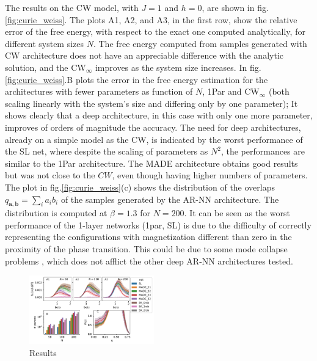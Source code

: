 \documentclass[aps,physrev,10pt,floatfix,reprint]{revtex4-2}
\begin{document}
The results on the CW model, with $J=1$ and $h=0$, are shown in fig.\ref{fig:curie_weiss}. 
The plots A1, A2, and A3, in the first row, show the relative error of the free energy, with respect to the exact one computed analytically, for different system sizes $N$. 
The free energy computed from samples generated with CW architecture does not have an appreciable difference with the analytic solution, and the CW$_{\infty}$ improves as the system size increases. In fig.\ref{fig:curie_weiss}.B plots the error in the free energy estimation for the architectures with fewer parameters as function of $N$, 1Par and CW$_{\infty}$ (both scaling linearly with the system's size and differing only by one parameter); It shows clearly that a deep architecture, in this case with only one more parameter, improves of orders of magnitude the accuracy. The need for deep architectures, already on a simple model as the CW, is indicated by the worst performance of the SL net, where despite the scaling of parameters as $N^2$, the performances are similar to the 1Par architecture. The MADE architecture obtains good results but was not close to the $CW$, even though having higher numbers of parameters. The plot in fig.\ref{fig:curie_weiss}(c) shows the distribution of the overlaps $q_{\mathbf{a}, \mathbf{b}}=\sum_{i} a_i b_i$ of the samples generated by the AR-NN architecture. The distribution is computed at $\beta=1.3$ for $N=200$. It can be seen as the worst performance of the 1-layer networks (1par, SL) is due to the difficulty of correctly representing the configurations with magnetization different than zero in the proximity of the phase transition. This could be due to some mode collapse problems \cite{https://doi.org/10.48550/arxiv.2210.11145}, which does not afflict the other deep AR-NN architectures tested.

\begin{figure}[]
    \centering 
    \includegraphics[width=0.48\textwidth]{img/SK_res.pdf}
    \caption{Results}
    \label{fig:SK}
\end{figure}
\end{document}
